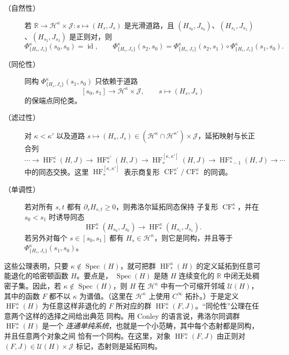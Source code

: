 \begin{description}
\item[（自然性）] 若
$\mathbb R\to\mathcal H^\kappa\times\mathcal J:s\mapsto(H_s,J_s)$ 是光滑道路，且
$(H_{s_0},J_{s_0})$、$(H_{s_1},J_{s_1})$、$(H_{s_2},J_{s_2})$ 是正则对，则
\[
  \Phi^\kappa_{\{H_s,J_s\}}(s_0,s_0)=\operatorname{id},
  \qquad
  \Phi^\kappa_{\{H_s,J_s\}}(s_2,s_0)
  =\Phi^\kappa_{\{H_s,J_s\}}(s_2,s_1)
  \circ\Phi^\kappa_{\{H_s,J_s\}}(s_1,s_0).
\]

\item[（同伦性）] 同构 $\Phi^\kappa_{\{H_s,J_s\}}(s_1,s_0)$ 只依赖于道路
\[
  [s_0,s_1]\longrightarrow\mathcal H^\kappa\times\mathcal J,
  \qquad s\longmapsto(H_s,J_s)
\]
的保端点同伦类。

\item[（滤过性）] 对 $\kappa<\kappa'$ 以及道路
$s\mapsto(H_s,J_s)\in(\mathcal H^\kappa\cap\mathcal H^{\kappa'})
\times\mathcal J$，延拓映射与长正合列
\[
  \cdots\longrightarrow\operatorname{HF}_*^\kappa(H,J)
  \longrightarrow\operatorname{HF}_*^{\kappa'}(H,J)
  \longrightarrow\operatorname{HF}_*^{[\kappa,\kappa']}(H,J)
  \longrightarrow\operatorname{HF}_{*-1}^\kappa(H,J)
  \longrightarrow\cdots
\]
中的同态交换。这里 $\operatorname{HF}_*^{[\kappa,\kappa']}$ 表示商复形
$\operatorname{CF}_*^{\kappa'}/\operatorname{CF}_*^\kappa$ 的同调。

\item[（单调性）] 若对所有 $s,t$ 都有 $\partial_sH_{s,t}\ge0$，则弗洛尔延拓同态保持
子复形 $\operatorname{CF}_*^\kappa$，并在 $s_0<s_1$ 时诱导同态
\[
  \operatorname{HF}_*^\kappa(H_{s_0},J_{s_0})
  \longrightarrow\operatorname{HF}_*^\kappa(H_{s_1},J_{s_1}).
\]
若另外对每个 $s\in[s_0,s_1]$ 都有 $H_s\in\mathcal H^\kappa$，则它是同构，并且等于
$\Phi^\kappa_{\{H_s,J_s\}}(s_1,s_0)$。
\end{description}

这些公理表明，只要 $\kappa\notin\operatorname{Spec}(H)$，就可把群
$\operatorname{HF}_*^\kappa(H)$ 的定义延拓到任意可能退化的哈密顿函数 $H$。要点是，
$\operatorname{Spec}(H)$ 是随 $H$ 连续变化的 $\mathbb R$ 中闭无处稠密子集。因此，若
$\kappa\notin\operatorname{Spec}(H)$，则 $H$ 在 $\mathcal H^\kappa$ 中有一个可缩开邻域
$\mathcal U(H)$，其中的函数 $F$ 都不以 $\kappa$ 为谱值。（这里在
$\mathcal H^\kappa$ 上使用 $C^\infty$ 拓扑。）于是定义
$\operatorname{HF}_*^\kappa(H)$ 为任意这样非退化的 $F$ 所对应的群
$\operatorname{HF}_*^\kappa(F,J)$。“同伦性”公理在任意两个这样的选择之间给出典范
同构。用 Conley 的语言说，弗洛尔同调群 $\operatorname{HF}_*^\kappa(H)$ 是一个
\emph{连通单纯系统}，也就是一个小范畴，其中每个态射都是同构，并且任意两个对象之间
恰有一个同构。在这里，对象 $\operatorname{HF}_*^\kappa(F,J)$ 由正则对
$(F,J)\in\mathcal U(H)\times\mathcal J$ 标记，态射则是延拓同构。

